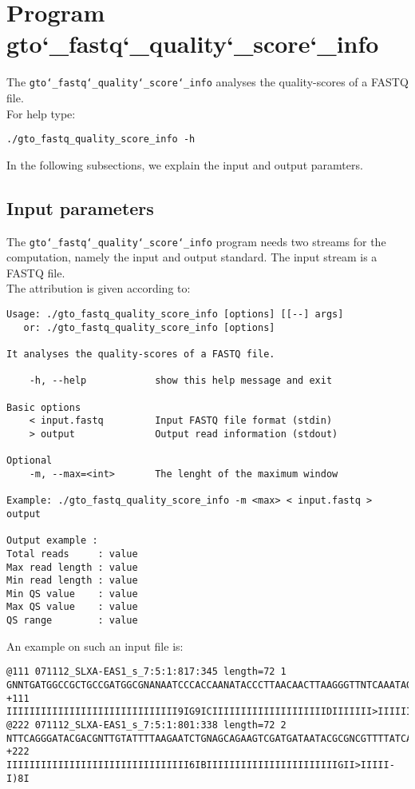 \section{Program gto\char`_fastq\char`_quality\char`_score\char`_info}
The \texttt{gto\char`_fastq\char`_quality\char`_score\char`_info} analyses the quality-scores of a FASTQ file.\\
For help type:
\begin{lstlisting}
./gto_fastq_quality_score_info -h
\end{lstlisting}
In the following subsections, we explain the input and output paramters.

\subsection*{Input parameters}

The \texttt{gto\char`_fastq\char`_quality\char`_score\char`_info} program needs two streams for the computation, namely the input and output standard. The input stream is a FASTQ file.\\
The attribution is given according to:
\begin{lstlisting}
Usage: ./gto_fastq_quality_score_info [options] [[--] args]
   or: ./gto_fastq_quality_score_info [options]

It analyses the quality-scores of a FASTQ file.

    -h, --help            show this help message and exit

Basic options
    < input.fastq         Input FASTQ file format (stdin)
    > output              Output read information (stdout)
    
Optional
    -m, --max=<int>       The lenght of the maximum window

Example: ./gto_fastq_quality_score_info -m <max> < input.fastq > output

Output example :
Total reads     : value
Max read length : value
Min read length : value
Min QS value    : value
Max QS value    : value
QS range        : value
\end{lstlisting}
An example on such an input file is:
\begin{lstlisting}
@111 071112_SLXA-EAS1_s_7:5:1:817:345 length=72 1
GNNTGATGGCCGCTGCCGATGGCGNANAATCCCACCAANATACCCTTAACAACTTAAGGGTTNTCAAATAGA
+111
IIIIIIIIIIIIIIIIIIIIIIIIIIIIII9IG9ICIIIIIIIIIIIIIIIIIIIIDIIIIIII>IIIIII/
@222 071112_SLXA-EAS1_s_7:5:1:801:338 length=72 2
NTTCAGGGATACGACGNTTGTATTTTAAGAATCTGNAGCAGAAGTCGATGATAATACGCGNCGTTTTATCAN
+222
IIIIIIIIIIIIIIIIIIIIIIIIIIIIIIII6IBIIIIIIIIIIIIIIIIIIIIIIIGII>IIIII-I)8I
\end{lstlisting}

